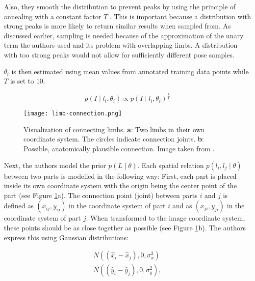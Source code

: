 Also, they smooth the distribution to prevent peaks by using the principle of annealing with a constant factor $T$ .
This is important because a distribution with strong peaks is more likely to return similar results when sampled from.
As discussed earlier, sampling is needed because of the approximation of the unary term the authors used and its problem with overlapping limbs.
A distribution with too strong peaks would not allow for sufficiently different pose samples.

$\theta_i$ is then estimated using mean values from annotated training data points while $T$ is set to $10$.

\begin{equation}
    \label{eq:smoothed}
    p(I \mid l_i, \theta_i) \propto p(I \mid l_i, \theta_i)^{\frac{1}{T}}
\end{equation}

\begin{figure}[htb!]
    \centering
    \texttt{[image: limb-connection.png]}
    \caption{Visualization of connecting limbs. \textbf{a}: Two limbs in their own coordinate system. The circles indicate connection joints. \textbf{b}: Possible, anatomically plausible connection. Image taken from \cite{felzenszwalb_pictorial_2005}.}
    \label{fig:limb-connection}
\end{figure}

Next, the authors model the prior $p(L \mid \theta)$.
Each spatial relation $p(l_i, l_j \mid \theta)$ between two parts is modelled in the following way:
First, each part is placed inside its own coordinate system with the origin being the center point of the part (see Figure \ref{fig:limb-connection}a).
The connection point (joint) between parts $i$ and $j$ is defined as $(x_{ij}, y_{ij})$ in the coordinate system of part $i$ and as $(x_{ji}, y_{ji})$ in the coordinate system of part $j$.
When transformed to the image coordinate system, these points should be as close together as possible (see Figure \ref{fig:limb-connection}b).
The authors express this using Gaussian distributions:

\begin{equation}
    \begin{split}
        N((\hat{x}_i - \hat{x}_j), 0, \sigma^2_x) \\
        N((\hat{y}_i - \hat{y}_j), 0, \sigma^2_y),       
    \end{split}
\end{equation}

